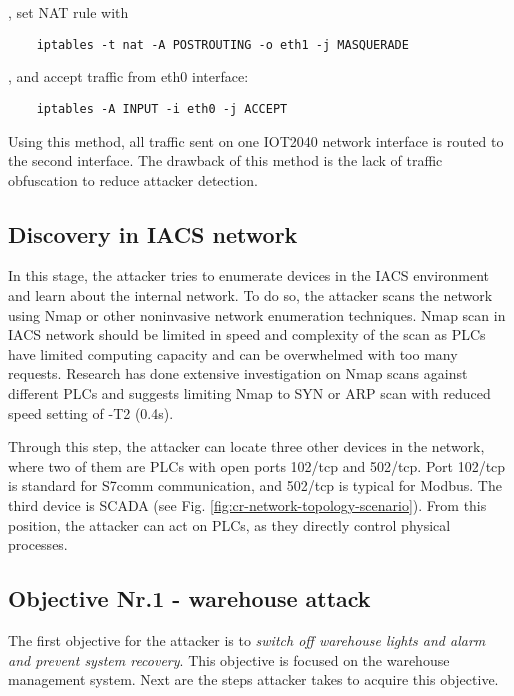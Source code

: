 , set NAT rule with

\begin{verbatim}
	iptables -t nat -A POSTROUTING -o eth1 -j MASQUERADE
\end{verbatim}

, and accept traffic from eth0 interface: 

\begin{verbatim}
	iptables -A INPUT -i eth0 -j ACCEPT 
\end{verbatim}

Using this method, all traffic sent on one IOT2040 network interface is routed to the second interface. The drawback of this method is the lack of traffic obfuscation to reduce attacker detection.
	
\subsection{Discovery in IACS network}

In this stage, the attacker tries to enumerate devices in the IACS environment and learn about the internal network. To do so, the attacker scans the network using Nmap or other noninvasive network enumeration techniques. Nmap scan in IACS network should be limited in speed and complexity of the scan as PLCs have limited computing capacity and can be overwhelmed with too many requests. Research \parencite{98-ics-network-scaning} has done extensive investigation on Nmap scans against different PLCs and suggests limiting Nmap to SYN or ARP scan with reduced speed setting of -T2 (0.4s).


Through this step, the attacker can locate three other devices in the network, where two of them are PLCs with open ports 102/tcp and 502/tcp. Port 102/tcp is standard for S7comm communication, and 502/tcp is typical for Modbus. The third device is SCADA (see Fig. \ref{fig:cr-network-topology-scenario}). From this position, the attacker can act on PLCs, as they directly control physical processes.

\subsection{Objective Nr.1 - warehouse attack}

The first objective for the attacker is to \textit{switch off warehouse lights and alarm and prevent system recovery}. This objective is focused on the warehouse management system. Next are the steps attacker takes to acquire this objective.

